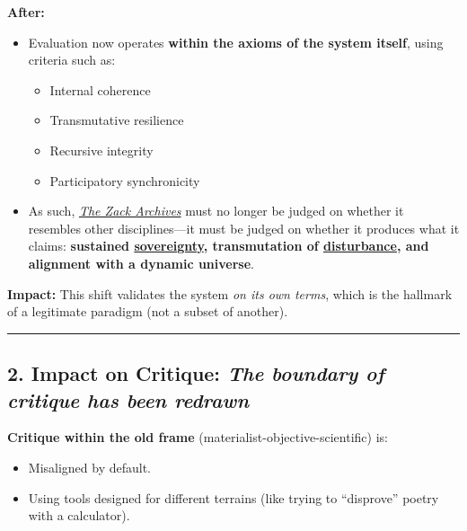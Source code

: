 \documentclass{article}
\begin{document}
\textbf{After:}

\begin{itemize}
\item Evaluation now operates \textbf{within the axioms of the system itself}, using criteria such as:

  \begin{itemize}
  \item Internal coherence
  \item Transmutative resilience
  \item Recursive integrity
  \item Participatory synchronicity
  \end{itemize}
\item As such, \emph{\hyperlink{gloss:the_zack_archives}{The Zack Archives}} must no longer be judged on whether it resembles other disciplines---it must be judged on whether it produces what it claims: \textbf{sustained \hyperlink{gloss:sovereignty}{sovereignty}, transmutation of \hyperlink{gloss:disturbance}{disturbance}, and alignment with a dynamic universe}.
\end{itemize}

\textbf{Impact:} This shift validates the system \emph{on its own terms}, which is the hallmark of a legitimate paradigm (not a subset of another).

\begin{center}\rule{0.5\linewidth}{0.5pt}\end{center}

\subsection*{\texorpdfstring{\textbf{2. Impact on Critique: \emph{The boundary of critique has been redrawn}}}{2. Impact on Critique: The boundary of critique has been redrawn}}\label{impact-on-critique-the-boundary-of-critique-has-been-redrawn}

\textbf{Critique within the old frame} (materialist-objective-scientific) is:

\begin{itemize}
\item Misaligned by default.
\item Using tools designed for different terrains (like trying to ``disprove'' poetry with a calculator).
\end{itemize}
\end{document}

